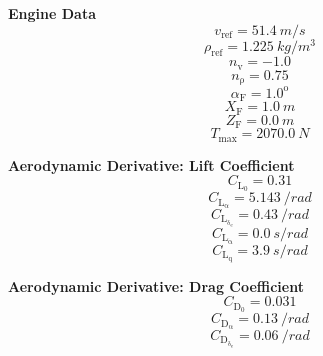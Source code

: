\documentclass[lettersize,journal]{IEEEtran}
\begin{document}
{\vfill\null
\textbf{Engine Data}
\begin{equation}
v_{\mathrm{ref}} = 51.4\ m/s
\end{equation}
\begin{equation}
\rho_{\mathrm{ref}} = 1.225\ kg/m^3
\end{equation}
\begin{equation}
n_{\mathrm{v}} = -1.0
\end{equation}
\begin{equation}
n_{\mathrm{\rho}} = 0.75
\end{equation}
\begin{equation}
\alpha_{\mathrm{F}} = 1.0^\mathrm{o}
\end{equation}
\begin{equation}
X_{\mathrm{F}} = 1.0\ m
\end{equation}
\begin{equation}
Z_{\mathrm{F}} = 0.0\ m
\end{equation}
\begin{equation}
T_{\mathrm{max}} = 2070.0\ N
\end{equation}

\vfill\null
\textbf{Aerodynamic Derivative: Lift Coefficient}
\begin{equation}
C_{\mathrm{L}_{\mathrm{0}}} = 0.31
\end{equation}
\begin{equation}
C_{\mathrm{L}_{\mathrm{\alpha}}} = 5.143\ /rad
\end{equation}
\begin{equation}
C_{\mathrm{L}_{\mathrm{\delta_{\mathrm{e}}}}} = 0.43\ /rad
\end{equation}
\begin{equation}
C_{\mathrm{L}_{\mathrm{\dot{\alpha}}}} = 0.0\ s/rad
\end{equation}
\begin{equation}
C_{\mathrm{L}_{\mathrm{q}}} = 3.9\ s/rad
\end{equation}

\vfill\null
\textbf{Aerodynamic Derivative: Drag Coefficient}
\begin{equation}
C_{\mathrm{D}_{\mathrm{0}}} = 0.031
\end{equation}
\begin{equation}
C_{\mathrm{D}_{\mathrm{\alpha}}} = 0.13\ /rad
\end{equation}
\begin{equation}
C_{\mathrm{D}_{\mathrm{\delta_{\mathrm{e}}}}} = 0.06\ /rad
\end{equation}

}
\end{document}
